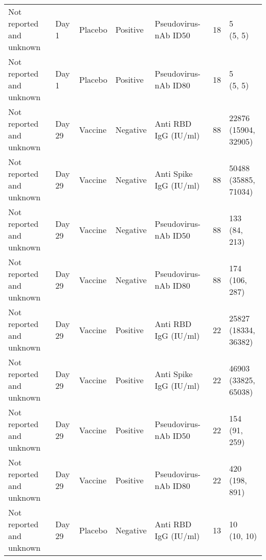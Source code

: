 \documentclass[]{book}
\theoremstyle{definition}
\theoremstyle{definition}
\theoremstyle{definition}
\newcommand{\1}{\mathbbm{1}}
\begin{document}
\begin{landscape}
\begin{ThreePartTable}
\begin{longtable}[t]{>{\raggedright\arraybackslash}p{7cm}llllll}
\hspace{1em}Not reported and unknown & Day 1 & Placebo & Positive & Pseudovirus-nAb ID50 & 18 & \makecell[l]{5\\(5, 5)}\\
\hspace{1em}Not reported and unknown & Day 1 & Placebo & Positive & Pseudovirus-nAb ID80 & 18 & \makecell[l]{5\\(5, 5)}\\
\hspace{1em}Not reported and unknown & Day 29 & Vaccine & Negative & Anti RBD IgG (IU/ml) & 88 & \makecell[l]{22876\\(15904, 32905)}\\
\hspace{1em}Not reported and unknown & Day 29 & Vaccine & Negative & Anti Spike IgG (IU/ml) & 88 & \makecell[l]{50488\\(35885, 71034)}\\
\hspace{1em}Not reported and unknown & Day 29 & Vaccine & Negative & Pseudovirus-nAb ID50 & 88 & \makecell[l]{133\\(84, 213)}\\
\hspace{1em}Not reported and unknown & Day 29 & Vaccine & Negative & Pseudovirus-nAb ID80 & 88 & \makecell[l]{174\\(106, 287)}\\
\hspace{1em}Not reported and unknown & Day 29 & Vaccine & Positive & Anti RBD IgG (IU/ml) & 22 & \makecell[l]{25827\\(18334, 36382)}\\
\hspace{1em}Not reported and unknown & Day 29 & Vaccine & Positive & Anti Spike IgG (IU/ml) & 22 & \makecell[l]{46903\\(33825, 65038)}\\
\hspace{1em}Not reported and unknown & Day 29 & Vaccine & Positive & Pseudovirus-nAb ID50 & 22 & \makecell[l]{154\\(91, 259)}\\
\hspace{1em}Not reported and unknown & Day 29 & Vaccine & Positive & Pseudovirus-nAb ID80 & 22 & \makecell[l]{420\\(198, 891)}\\
\hspace{1em}Not reported and unknown & Day 29 & Placebo & Negative & Anti RBD IgG (IU/ml) & 13 & \makecell[l]{10\\(10, 10)}\\

\end{longtable}
\end{ThreePartTable}
\end{landscape}
\end{document}
